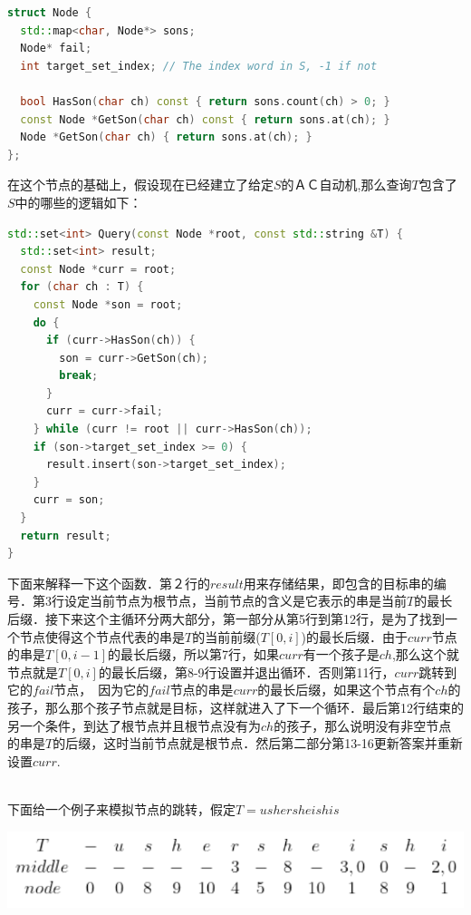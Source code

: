 \documentclass{article}
\begin{document}
\begin{lstlisting}[language=C++, caption={Node defination}]
struct Node {
  std::map<char, Node*> sons;
  Node* fail;
  int target_set_index; // The index word in S, -1 if not

  bool HasSon(char ch) const { return sons.count(ch) > 0; }
  const Node *GetSon(char ch) const { return sons.at(ch); }
  Node *GetSon(char ch) { return sons.at(ch); }
};
\end{lstlisting}

在这个节点的基础上，假设现在已经建立了给定$S$的ＡＣ自动机,那么查询$T$包含了$S$中的哪些的逻辑如下：　\par

\begin{lstlisting}[language=C++, caption={Query}]
std::set<int> Query(const Node *root, const std::string &T) {
  std::set<int> result;
  const Node *curr = root;
  for (char ch : T) {
    const Node *son = root;
    do {
      if (curr->HasSon(ch)) {
        son = curr->GetSon(ch);
        break;
      }
      curr = curr->fail;
    } while (curr != root || curr->HasSon(ch));
    if (son->target_set_index >= 0) {
      result.insert(son->target_set_index);
    }
    curr = son;
  }
  return result;
}
\end{lstlisting}
下面来解释一下这个函数．第２行的$result$用来存储结果，即包含的目标串的编号．第3行设定当前节点为根节点，当前节点的含义是它表示的串是当前$T$的最长后缀．接下来这个主循环分两大部分，第一部分从第5行到第12行，是为了找到一个节点使得这个节点代表的串是$T$的当前前缀($T[0,i]$)的最长后缀．由于$curr$节点的串是$T[0,i-1]$的最长后缀，所以第7行，如果$curr$有一个孩子是$ch$,那么这个就节点就是$T[0,i]$的最长后缀，第8-9行设置并退出循环．否则第11行，$curr$跳转到它的$fail$节点，　因为它的$fail$节点的串是$curr$的最长后缀，如果这个节点有个$ch$的孩子，那么那个孩子节点就是目标，这样就进入了下一个循环．最后第12行结束的另一个条件，到达了根节点并且根节点没有为$ch$的孩子，那么说明没有非空节点的串是$T$的后缀，这时当前节点就是根节点．然后第二部分第13-16更新答案并重新设置$curr$.　\par
~\\
下面给一个例子来模拟节点的跳转，假定$T=ushersheishis$ \par
\includegraphics[scale=0.5]{pic4.png} \par
\end{document}
